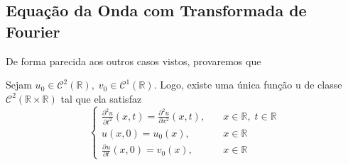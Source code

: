 \documentclass[../pde_notes.tex]{subfiles}
\begin{document}
\subsection{Equação da Onda com Transformada de Fourier}
De forma parecida aos outros casos vistos, provaremos que
\begin{theorem*}
	Sejam \(u_{0}\in \mathcal{C}^{2}(\mathbb{R}),\; v_{0}\in \mathcal{C}^{1}(\mathbb{R})\). Logo, existe uma única função u de classe \(\mathcal{C}^{2}(\mathbb{R}\times \mathbb{R})\) tal que ela satisfaz
	\[
		\left\{\begin{array}{ll}
			\frac{\partial^{2}u}{\partial t^{2}}(x, t) = \frac{\partial^{2}u}{\partial x^{2}}(x, t), & \quad x\in \mathbb{R},\; t\in \mathbb{R} \\
			u(x, 0) = u_{0}(x),                                                                      & \quad x\in \mathbb{R}                    \\
			\frac{\partial^{}u}{\partial t^{}}(x, 0) = v_{0}(x),                                     & \quad x\in \mathbb{R}
		\end{array}\right.
	\]
\end{theorem*}
\end{document}
